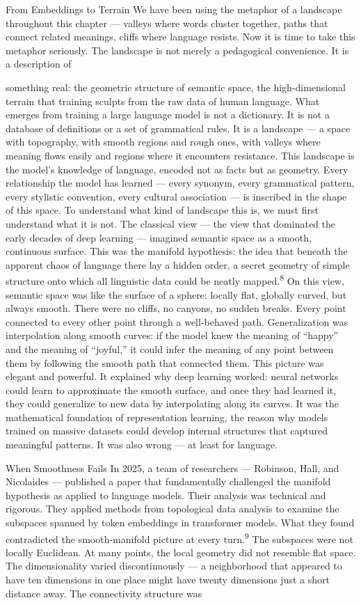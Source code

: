 From Embeddings to Terrain We have been using the metaphor of a landscape throughout this chapter — valleys where words cluster together, paths that connect related meanings, cliffs where language resists. Now it is time to take this metaphor seriously. The landscape is not merely a pedagogical convenience. It is a description of

something real: the geometric structure of semantic space, the high-dimensional terrain that training sculpts from the raw data of human language. What emerges from training a large language model is not a dictionary. It is not a database of definitions or a set of grammatical rules. It is a landscape — a space with topography, with smooth regions and rough ones, with valleys where meaning flows easily and regions where it encounters resistance. This landscape is the model’s knowledge of language, encoded not as facts but as geometry. Every relationship the model has learned — every synonym, every grammatical pattern, every stylistic convention, every cultural association — is inscribed in the shape of this space. To understand what kind of landscape this is, we must first understand what it is not. The classical view — the view that dominated the early decades of deep learning — imagined semantic space as a smooth, continuous surface. This was the manifold hypothesis: the idea that beneath the apparent chaos of language there lay a hidden order, a secret geometry of simple structure onto which all linguistic data could be neatly mapped.\textsuperscript{8} On this view, semantic space was like the surface of a sphere: locally flat, globally curved, but always smooth. There were no cliffs, no canyons, no sudden breaks. Every point connected to every other point through a well-behaved path. Generalization was interpolation along smooth curves: if the model knew the meaning of “happy” and the meaning of “joyful,” it could infer the meaning of any point between them by following the smooth path that connected them. This picture was elegant and powerful. It explained why deep learning worked: neural networks could learn to approximate the smooth surface, and once they had learned it, they could generalize to new data by interpolating along its curves. It was the mathematical foundation of representation learning, the reason why models trained on massive datasets could develop internal structures that captured meaningful patterns. It was also wrong — at least for language.

When Smoothness Fails In 2025, a team of researchers — Robinson, Hall, and Nicolaides — published a paper that fundamentally challenged the manifold hypothesis as applied to language models. Their analysis was technical and rigorous. They applied methods from topological data analysis to examine the subspaces spanned by token embeddings in transformer models. What they found contradicted the smooth-manifold picture at every turn.\textsuperscript{9} The subspaces were not locally Euclidean. At many points, the local geometry did not resemble flat space. The dimensionality varied discontinuously — a neighborhood that appeared to have ten dimensions in one place might have twenty dimensions just a short distance away. The connectivity structure was

